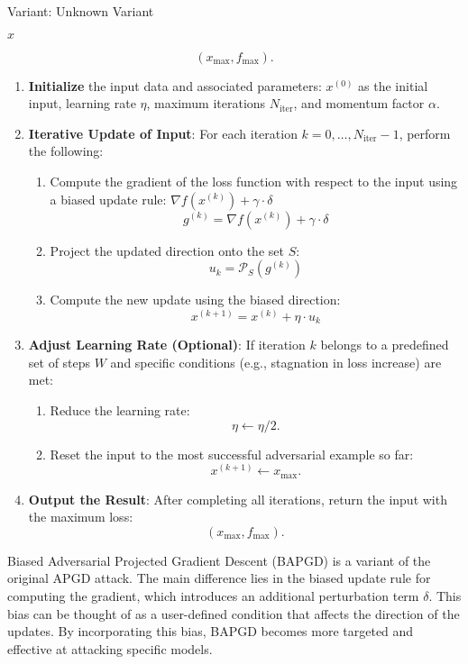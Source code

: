 Variant: Unknown Variant

$x$

 \[
    (x_{\text{max}}, f_{\text{max}}).
    \]


\begin{enumerate}
    \item \textbf{Initialize} the input data and associated parameters:  
    $x^{(0)}$ as the initial input, learning rate $\eta$, maximum iterations $N_{\text{iter}}$, and momentum factor $\alpha$.

    \item \textbf{Iterative Update of Input}:  
    For each iteration $k = 0, \dots, N_{\text{iter}} - 1$, perform the following:  
    \begin{enumerate}
        \item Compute the gradient of the loss function with respect to the input using a biased update rule: $\nabla f(x^{(k)}) + \gamma \cdot \delta$
        \[
        g^{(k)} = \nabla f(x^{(k)}) + \gamma \cdot \delta
        \]
        \item Project the updated direction onto the set $S$: 
        \[
        u_k = \mathcal{P}_S(g^{(k)})
        \]

        \item Compute the new update using the biased direction: 
        \[
        x^{(k+1)} = x^{(k)} + \eta \cdot u_k
        \]
    \end{enumerate}
    \item \textbf{Adjust Learning Rate (Optional)}:  
    If iteration $k$ belongs to a predefined set of steps $W$ and specific conditions (e.g., stagnation in loss increase) are met:  
    \begin{enumerate}
        \item Reduce the learning rate:  
        \[
        \eta \gets \eta / 2.
        \]
        \item Reset the input to the most successful adversarial example so far:  
        \[
        x^{(k+1)} \gets x_{\text{max}}.
        \]
    \end{enumerate}

    \item \textbf{Output the Result}:  
    After completing all iterations, return the input with the maximum loss:  
    \[
    (x_{\text{max}}, f_{\text{max}}).
    \]
\end{enumerate}

Biased Adversarial Projected Gradient Descent (BAPGD) is a variant of the original APGD attack. The main difference lies in the biased update rule for computing the gradient, which introduces an additional perturbation term $\delta$. This bias can be thought of as a user-defined condition that affects the direction of the updates. By incorporating this bias, BAPGD becomes more targeted and effective at attacking specific models.